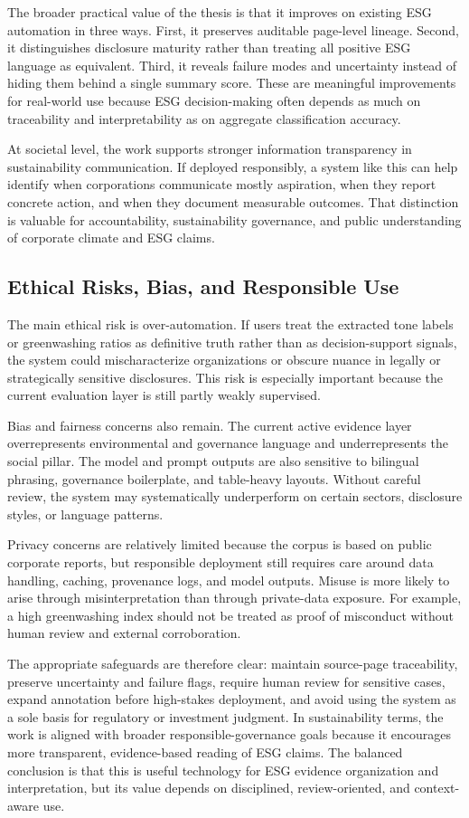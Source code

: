 The broader practical value of the thesis is that it improves on existing ESG automation in three ways. First, it preserves auditable page-level lineage. Second, it distinguishes disclosure maturity rather than treating all positive ESG language as equivalent. Third, it reveals failure modes and uncertainty instead of hiding them behind a single summary score. These are meaningful improvements for real-world use because ESG decision-making often depends as much on traceability and interpretability as on aggregate classification accuracy.

At societal level, the work supports stronger information transparency in sustainability communication. If deployed responsibly, a system like this can help identify when corporations communicate mostly aspiration, when they report concrete action, and when they document measurable outcomes. That distinction is valuable for accountability, sustainability governance, and public understanding of corporate climate and ESG claims.

\subsection{Ethical Risks, Bias, and Responsible Use}

The main ethical risk is over-automation. If users treat the extracted tone labels or greenwashing ratios as definitive truth rather than as decision-support signals, the system could mischaracterize organizations or obscure nuance in legally or strategically sensitive disclosures. This risk is especially important because the current evaluation layer is still partly weakly supervised.

Bias and fairness concerns also remain. The current active evidence layer overrepresents environmental and governance language and underrepresents the social pillar. The model and prompt outputs are also sensitive to bilingual phrasing, governance boilerplate, and table-heavy layouts. Without careful review, the system may systematically underperform on certain sectors, disclosure styles, or language patterns.

Privacy concerns are relatively limited because the corpus is based on public corporate reports, but responsible deployment still requires care around data handling, caching, provenance logs, and model outputs. Misuse is more likely to arise through misinterpretation than through private-data exposure. For example, a high greenwashing index should not be treated as proof of misconduct without human review and external corroboration.

The appropriate safeguards are therefore clear: maintain source-page traceability, preserve uncertainty and failure flags, require human review for sensitive cases, expand annotation before high-stakes deployment, and avoid using the system as a sole basis for regulatory or investment judgment. In sustainability terms, the work is aligned with broader responsible-governance goals because it encourages more transparent, evidence-based reading of ESG claims. The balanced conclusion is that this is useful technology for ESG evidence organization and interpretation, but its value depends on disciplined, review-oriented, and context-aware use.
